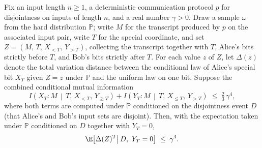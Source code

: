 \begin{theorem}
\label{CommunicationComplexity.Functions.Disjointness.RandomizedLowerBound.integral_xDistance_sq_disjointSpecialYFalse_le_gamma_pow_four}
\leanok
{}
Fix an input length $n \ge 1$, a deterministic communication protocol $p$ for
disjointness on inputs of length $n$, and a real number $\gamma > 0$. Draw a sample
$\omega$ from the hard distribution $\mathbb{P}$; write $M$ for the transcript produced
by $p$ on the associated input pair, write $T$ for the special coordinate, and set $Z =
(M,\, T,\, X_{<T},\, Y_{>T})$, collecting the transcript together with $T$, Alice's bits
strictly before $T$, and Bob's bits strictly after $T$. For each value $z$ of $Z$, let
$\Delta(z)$ denote the total variation distance between the conditional law of Alice's
special bit $X_T$ given $Z = z$ under $\mathbb{P}$ and the uniform law on one bit.
Suppose the combined conditional mutual information
\[
I\!\left(X_T : M \,\middle|\, T,\, X_{<T},\, Y_{\ge T}\right) + I\!\left(Y_T : M
\,\middle|\, T,\, X_{\le T},\, Y_{>T}\right) \;\le\; \tfrac{2}{3}\,\gamma^4,
\]
where both terms are computed under $\mathbb{P}$ conditioned on the disjointness event
$D$ (that Alice's and Bob's input sets are disjoint). Then, with the expectation taken
under $\mathbb{P}$ conditioned on $D$ together with $Y_T = 0$,
\[
  \E\!\left[\Delta(Z)^2 \,\middle|\, D,\ Y_T = 0\right] \;\le\; \gamma^4.
\]
\end{theorem}

